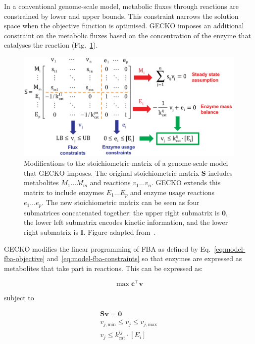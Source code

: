In a conventional genome-scale model, metabolic fluxes through reactions are constrained by lower and upper bounds.
This constraint narrows the solution space when the objective function is optimised.
GECKO imposes an additional constraint on the metabolic fluxes based on the concentration of the enzyme that catalyses the reaction (Fig.\ \ref{fig:model-gecko}).

\begin{figure}
  \centering
  \includegraphics[width=0.9\linewidth]{sanchezImprovingPhenotypePredictions2017_1b_adapted}
  \caption[
    Modifications to the stoichiometric matrix of a genome-scale model that GECKO imposes
  ]{
    Modifications to the stoichiometric matrix of a genome-scale model that GECKO imposes.
    The original stoichiometric matrix $\mathbf{S}$ includes metabolites $M_{1} \ldots M_{m}$ and reactions $v_{1} \ldots v_{n}$.
    GECKO extends this matrix to include enzymes $E_{1} \ldots E_{p}$ and enzyme usage reactions $e_{1} \ldots e_{p}$.
    The new stoichiometric matrix can be seen as four submatrices concatenated together: the upper right submatrix is $\mathbf{0}$, the lower left submatrix encodes kinetic information, and the lower right submatrix is $\mathbf{I}$.
    Figure adapted from~\textcite{sanchezImprovingPhenotypePredictions2017}.
  }
  \label{fig:model-gecko}
\end{figure}

GECKO modifies the linear programming of FBA as defined by Eq.\ \ref{eq:model-fba-objective} and~\ref{eq:model-fba-constraints} so that enzymes are expressed as metabolites that take part in reactions.
This can be expressed as:

\begin{equation}
  \max \mathbf{c}^{\intercal} \mathbf{v}
  \label{eq:model-gecko-fba-objective}
\end{equation}

subject to

\begin{equation}
  \begin{gathered}
    \mathbf{S} \mathbf{v} = \mathbf{0}\\
    v_{j,\mathrm{min}} \leq v_{j} \leq v_{j,\mathrm{max}}\\
    v_{j} \leq k_{\mathrm{cat}}^{ij} \cdot [E_{i}]
  \end{gathered}
  \label{eq:model-gecko-fba-constraints}
\end{equation}

